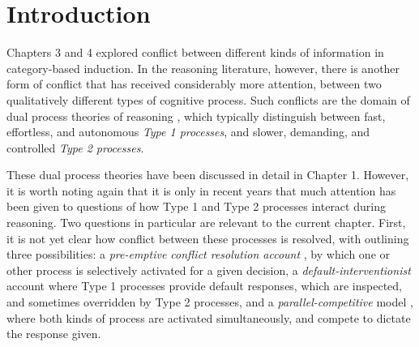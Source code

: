 
\section{Introduction}

Chapters 3 and 4 explored conflict between
different kinds of information in category-based induction.
In the reasoning literature, however, there is another form of conflict
that has received considerably more attention,
between two qualitatively different types of cognitive process.
Such conflicts are the domain of dual process theories of reasoning
\citep{Evans2013a,Evans2006,Sloman1996,Kahneman2011},
which typically distinguish between
fast, effortless, and autonomous \emph{Type 1 processes},
and slower, demanding, and controlled \emph{Type 2 processes}.

These dual process theories have been discussed in detail in Chapter 1.
However, it is worth noting again that it is only in recent years
that much attention has been given to questions of
how Type 1 and Type 2 processes interact during reasoning.
Two questions in particular are relevant to the current chapter.
First, it is not yet clear how conflict between these processes is resolved,
with \citet{Evans2007a} outlining three possibilities:
a \emph{pre-emptive conflict resolution account}
\citep[e.g.][]{Klaczynski2000,Klaczynski2004,Chaiken1987},
by which one or other process is selectively activated for a given decision,
a \emph{default-interventionist} account
\citep[e.g.][]{Evans2006,Kahneman2002}
where Type 1 processes provide default responses,
which are inspected, and sometimes overridden by Type 2 processes,
and a \emph{parallel-competitive} model
\citep[e.g.][]{Sloman1996,Sloman2014},
where both kinds of process are activated simultaneously,
and compete to dictate the response given.

